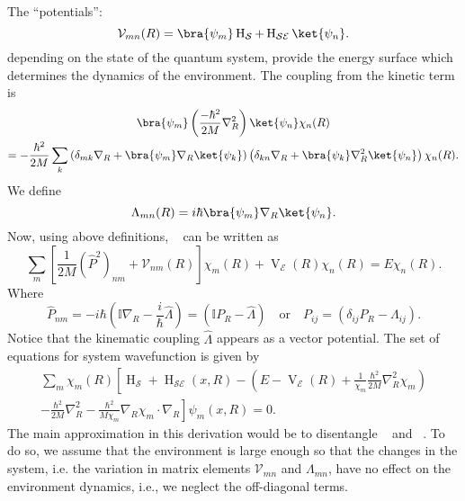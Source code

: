 The ``potentials'':
\begin{equation}
    \mathcal{V}_{mn}(R) = \bra{\psi_m} \operatorname{H}_{\mathcal{S}} + \operatorname{H}_{\mathcal{SE}}
    \ket{\psi_n}.
\end{equation}
depending on the state of the quantum system, provide the energy surface
which determines the dynamics of the environment. The coupling from the kinetic term is
\begin{equation}
    \begin{gathered}
        \bra{\psi_m} \left(\frac{-\hbar^2}{2M} 
        \nabla_R^2 \right) \ket{\psi_n} \chi_n(R) \\
        = -\frac{\hbar^2}{2M} \sum_k \left(\delta_{mk} \nabla_R+ \bra{\psi_m}\nabla_R
    \ket{\psi_k}\right)\left(\delta_{kn} \nabla_R+ \bra{\psi_k}\nabla_R^2\ket{\psi_n}\right)
     \chi_n(R).
    \end{gathered}
\end{equation}
We define
\begin{equation}
    \Lambda_{mn}(R) = i\hbar \bra{\psi_m}\nabla_R\ket{\psi_n}.
\end{equation}
Now, using above definitions, ~ can be written as
\begin{equation}
    \label{eqn:chap2_clc_evol}
    \sum_m \left[ \frac{1}{2M} ({\hat{P}}^2)_{nm} +  
    \mathcal{V}_{nm}(R)\right] \chi_m(R) + \operatorname{V}_{\mathcal{E}}(R) \chi_n(R) 
    = E \chi_n(R).
\end{equation}
Where
\begin{equation}
    {\hat{P}}_{nm} = -i\hbar \left(\mathbb{I}\nabla_R - \frac{i}{\hbar}
    \hat{\Lambda} \right) =
 \left(\mathbb{I}P_R - \hat{\Lambda}\right) \quad \text{or} \quad P_{ij} = 
 \left(\delta_{ij}P_R - {\Lambda}_{ij}\right).
\end{equation}
Notice that the kinematic coupling
$\hat{\Lambda}$ appears as a vector potential. 
The set of equations for system wavefunction is given by
\begin{multline}
    \label{eqn:chap2_system_evol}
    \sum_{m} \chi_m(R) \left[
    \operatorname{H}_{\mathcal{S}} + \operatorname{H}_{\mathcal{SE}}(x, R)  - \left(
        E - \operatorname{V}_{\mathcal{E}}(R) + 
        \frac{1}{\chi_m} \frac{\hbar^2}{2M} \nabla_R^2 \chi_m
    \right) \right. \\\left. - \frac{\hbar^2}{2M} \nabla_R^2 - 
    \frac{\hbar^2}{M\chi_m} \nabla_R \chi_m \cdot \nabla_R \right] \psi_m(x, R) = 0.
\end{multline}
The main approximation in this derivation would be to disentangle 
~ and ~. To do so, 
we assume that the environment is large enough so that the changes in the system,
i.e. the variation in matrix elements $\mathcal{V}_{mn}$ and $\Lambda_{mn}$, have
no effect on the environment dynamics, i.e., we neglect the off-diagonal terms. 

